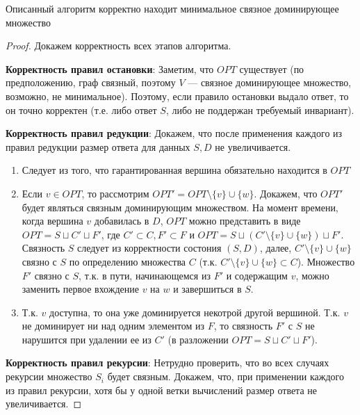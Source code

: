 \begin{theorem}
    Описанный алгоритм корректно находит минимальное связное доминирующее множество
\end{theorem}
\begin{proof}
    Докажем корректность всех этапов алгоритма.

    \textbf{Корректность правил остановки}: Заметим, что \(OPT\) существует (по предположению, граф связный, поэтому \(V\) --- связное доминирующее множество, возможно, не минимальное). Поэтому, если правило остановки выдало ответ, то он точно корректен (т.е. либо ответ \(S\), либо не поддержан требуемый инвариант). 

    \textbf{Корректность правил редукции}: Докажем, что после применения каждого из правил редукции размер ответа для данных \(S, D\) не увеличивается.

    \begin{enumerate}[label=\alph*]
        \item Следует из того, что гарантированная вершина обязательно находится в \(OPT\)
        \item Если \(v \in OPT\), то рассмотрим \(OPT' = OPT \setminus \{v\} \cup \{w\}\). Докажем, что \(OPT'\) будет являться связным доминирующим множеством. На момент времени, когда вершина \(v\) добавилась в \(D\), \(OPT\) можно представить в виде \(OPT = S \sqcup C' \sqcup F'\), где \(C' \subset C, F' \subset F\) и \(OPT = S \sqcup (C' \setminus \{v\} \cup \{w\}) \sqcup F'\). Связность \(S\) следует из корректности состония \((S, D)\), далее, \(C' \setminus \{v\} \cup \{w\}\) связно с \(S\) по определению множества \(C\) (т.к. \(C' \setminus \{v\} \cup \{w\} \subset C\)). Множество \(F'\) связно с \(S\), т.к. в пути, начинающемся из \(F'\) и содержащим \(v\), можно заменить первое вхождение \(v\) на \(w\) и завершиться в \(S\).
        \item Т.к. \(v\) доступна, то она уже доминируется некотрой другой вершиной. Т.к. \(v\) не доминирует ни над одним элементом из \(F\), то связность \(F'\) с \(S\) не нарушится при удалении ее из \(C'\) (в разложении \(OPT = S \sqcup C' \sqcup F'\)).
    \end{enumerate}

    \textbf{Корректность правил рекурсии}: Нетрудно проверить, что во всех случаях рекурсии множество \(S_i\) будет связным. Докажем, что, при применении каждого из правил рекурсии, хотя бы у одной ветки вычислений размер ответа не увеличивается.


\end{proof}
